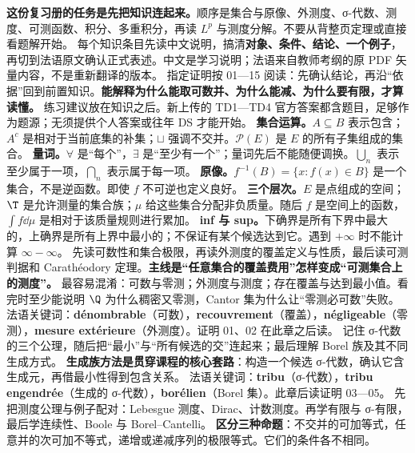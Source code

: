 \textbf{这份复习册的任务是先把知识连起来。}顺序是集合与原像、外测度、σ-代数、测度、可测函数、积分、多重积分，再读 $L^p$ 与测度分解。不要从背整页定理或直接看题解开始。
每个知识条目先读中文说明，搞清\textbf{对象、条件、结论、一个例子}，再切到法语原文确认正式表述。中文是学习说明；法语来自教师考纲的原 PDF 矢量内容，不是重新翻译的版本。
指定证明按 01—15 阅读：先确认结论，再沿“依据”回到前置知识。\textbf{能解释为什么能取可数并、为什么能减、为什么要有限，才算读懂。}
练习建议放在知识之后。新上传的 TD1—TD4 官方答案都含题目，足够作为题源；无须提供个人答案或往年 DS 才能开始。
\textbf{集合运算。}$A\subseteq B$ 表示包含；$A^c$ 是相对于当前底集的补集；$\sqcup$ 强调不交并。$\mathcal P(E)$ 是 $E$ 的所有子集组成的集合。
\textbf{量词。}$\forall$ 是“每个”，$\exists$ 是“至少有一个”；量词先后不能随便调换。$\bigcup_n$ 表示至少属于一项，$\bigcap_n$ 表示属于每一项。
\textbf{原像。}$f^{-1}(B)=\{x:f(x)\in B\}$ 是一个集合，不是逆函数。即使 $f$ 不可逆也定义良好。
\textbf{三个层次。}$E$ 是点组成的空间；$\T$ 是允许测量的集合族；$\mu$ 给这些集合分配非负质量。随后 $f$ 是空间上的函数，$\int f\dd\mu$ 是相对于该质量规则进行累加。
\textbf{inf 与 sup。}下确界是所有下界中最大的，上确界是所有上界中最小的；不保证有某个候选达到它。遇到 $+\infty$ 时不能计算 $\infty-\infty$。
先读可数性和集合极限，再读外测度的覆盖定义与性质，最后读可测判据和 Carathéodory 定理。\textbf{主线是“任意集合的覆盖费用”怎样变成“可测集合上的测度”。}
最容易混淆：可数与零测；外测度与测度；存在覆盖与达到最小值。看完时至少能说明 $\Q$ 为什么稠密又零测，Cantor 集为什么让“零测必可数”失败。
法语关键词：\textbf{dénombrable}（可数），\textbf{recouvrement}（覆盖），\textbf{négligeable}（零测），\textbf{mesure extérieure}（外测度）。证明 01、02 在此章之后读。
记住 σ-代数的三个公理，随后把“最小”与“所有候选的交”连起来；最后理解 Borel 族及其不同生成方式。
\textbf{生成族方法是贯穿课程的核心套路}：构造一个候选 σ-代数，确认它含生成元，再借最小性得到包含关系。
法语关键词：\textbf{tribu}（σ-代数），\textbf{tribu engendrée}（生成的 σ-代数），\textbf{borélien}（Borel 集）。此章后读证明 03—05。
先把测度公理与例子配对：Lebesgue 测度、Dirac、计数测度。再学有限与 σ-有限，最后学连续性、Boole 与 Borel–Cantelli。
\textbf{区分三种命题}：不交并的可加等式，任意并的次可加不等式，递增或递减序列的极限等式。它们的条件各不相同。

